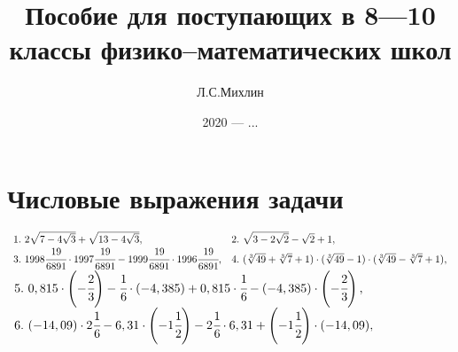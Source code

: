 \documentclass[12pt]{article}
\author{Л.С.Михлин}
\title{Пособие для поступающих в 8---10 классы физико--математических школ}
\date{2020 --- ...}
\begin{document}
\maketitle
\newpage
\tableofcontents
\newpage
\section{Числовые выражения задачи}
$\begin{array}{ll}
1.\ 2\sqrt{7-4\sqrt{3}}+\sqrt{13-4\sqrt{3}},&
2.\ \sqrt{3-2\sqrt{2}}-\sqrt{2}+1,\\
3.\ 1998\cfrac{19}{6891}\cdot1997\cfrac{19}{6891}-1999\cfrac{19}{6891}\cdot1996\cfrac{19}{6891},&
4.\ (\sqrt[3]{49}+\sqrt[3]{7}+1)\cdot(\sqrt[3]{49}-1)\cdot(\sqrt[3]{49}-\sqrt[3]{7}+1),
\end{array}$\\
$\begin{array}{l}
5.\ 0,815\cdot\left(-\cfrac{2}{3}\right)-\cfrac{1}{6}\cdot(-4,385)+0,815\cdot\cfrac{1}{6}-(-4,385)\cdot\left(-\cfrac{2}{3}\right),\\
6.\ (-14,09)\cdot 2\cfrac{1}{6}-6,31\cdot\left(-1\cfrac{1}{2}\right)-2\cfrac{1}{6}\cdot6,31+\left(-1\cfrac{1}{2}\right)\cdot(-14,09),
\end{array}$\\
\end{document}
